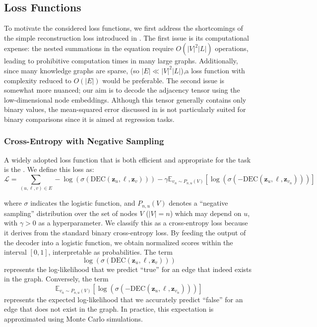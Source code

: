 \subsection{Loss Functions}
To motivate the considered loss functions, we first address the shortcomings of the simple reconstruction loss introduced in . The first issue is its computational expense: the nested summations in the equation require $ O(|V|^2|L|) $ operations, leading to prohibitive computation times in many large graphs. Additionally, since many knowledge graphs are sparse, (so $ |E| \ll |V|^2|L| $),a loss function with complexity reduced to $ O(|E|) $ would be preferable. The second issue is somewhat more nuanced; our aim is to decode the adjacency tensor using the low-dimensional node embeddings. Although this tensor generally contains only binary values, the mean-squared error discussed in  is not particularly suited for binary comparisons since it is aimed at regression tasks.

\subsubsection{Cross-Entropy with Negative Sampling}
A widely adopted loss function that is both efficient and appropriate for the task is the . We define this loss as:
\begin{equation*}
    \mathcal{L} = \sum_{(u,\ell,v)\in E} -\log(\sigma(\text{DEC}(\mathbf{z}_u, \ell, \mathbf{z}_v))) - \gamma\mathbb{E}_{v_n\sim P_{n,u}(V)}[\log(\sigma(-\text{DEC}(\mathbf{z}_u, \ell, \mathbf{z}_{v_n})))]
\end{equation*}

where $ \sigma $ indicates the logistic function, and $ P_{n,u}(V) $ denotes a ``negative sampling'' distribution over the set of nodes $ V $ ($|V|=n$) which may depend on $ u $, with $ \gamma > 0 $ as a hyperparameter. 
We classify this as a cross-entropy loss because it derives from the standard binary cross-entropy loss. By feeding the output of the decoder into a logistic function, we obtain normalized scores within the interval $[0,1]$, interpretable as probabilities. The term
\begin{equation}\label{eq:logLikelihood}
    \log(\sigma(\text{DEC}(\mathbf{z}_u, \ell, \mathbf{z}_v)))
\end{equation}
represents the log-likelihood that we predict ``true'' for an edge that indeed exists in the graph. Conversely, the term
\begin{equation}\label{eq:negativeLogLikelihood}
    \mathbb{E}_{v_n\sim P_{n,u}(V)}[\log(\sigma(-\text{DEC}(\mathbf{z}_u, \ell, \mathbf{z}_{v_n})))]
\end{equation}
represents the expected log-likelihood that we accurately predict ``false'' for an edge that does not exist in the graph. In practice, this expectation is approximated using Monte Carlo simulations.

